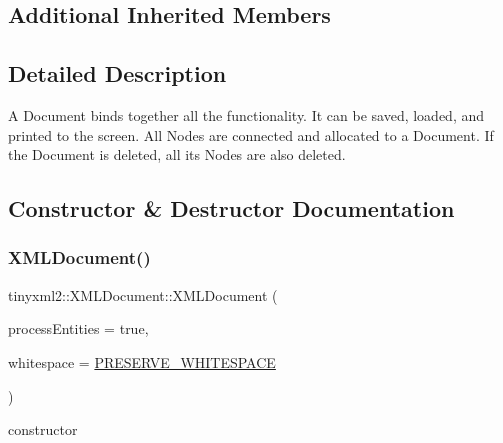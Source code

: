 \subsection*{Additional Inherited Members}


\subsection{Detailed Description}
A Document binds together all the functionality. It can be saved, loaded, and printed to the screen. All Nodes are connected and allocated to a Document. If the Document is deleted, all its Nodes are also deleted. 

\subsection{Constructor \& Destructor Documentation}
\mbox{\label{classtinyxml2_1_1_x_m_l_document_af1574f76ebb619f25ef3f09eb2ba5188}} 
\subsubsection{\texorpdfstring{X\+M\+L\+Document()}{XMLDocument()}}
{\footnotesize\ttfamily tinyxml2\+::\+X\+M\+L\+Document\+::\+X\+M\+L\+Document (\begin{DoxyParamCaption}\item[{bool}]{process\+Entities = {\ttfamily true},  }\item[{\hyperlink{namespacetinyxml2_a7f91d00f77360f850fd5da0861e27dd5}{Whitespace}}]{whitespace = {\ttfamily \hyperlink{namespacetinyxml2_a7f91d00f77360f850fd5da0861e27dd5a751769aa625fe5fe5286e9779edec56a}{P\+R\+E\+S\+E\+R\+V\+E\+\_\+\+W\+H\+I\+T\+E\+S\+P\+A\+CE}} }\end{DoxyParamCaption})}



constructor 

\mbox{\label{classtinyxml2_1_1_x_m_l_document_af37c47d8e2ba4b2fc81b21a77a32579b}} 
